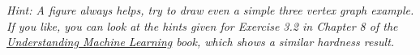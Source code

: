 \documentclass[11pt]{article}
\begin{document}
\begin{enumerate}[(a)]
    \emph{Hint: A figure always helps, try to draw even a simple three vertex graph example. If you like, you can look at the hints given for Exercise 3.2 in Chapter 8 of the \href{https://www.cs.huji.ac.il/~shais/UnderstandingMachineLearning/understanding-machine-learning-theory-algorithms.pdf}{Understanding Machine Learning} book, which shows a similar hardness result.}

\end{enumerate}




\end{document}
